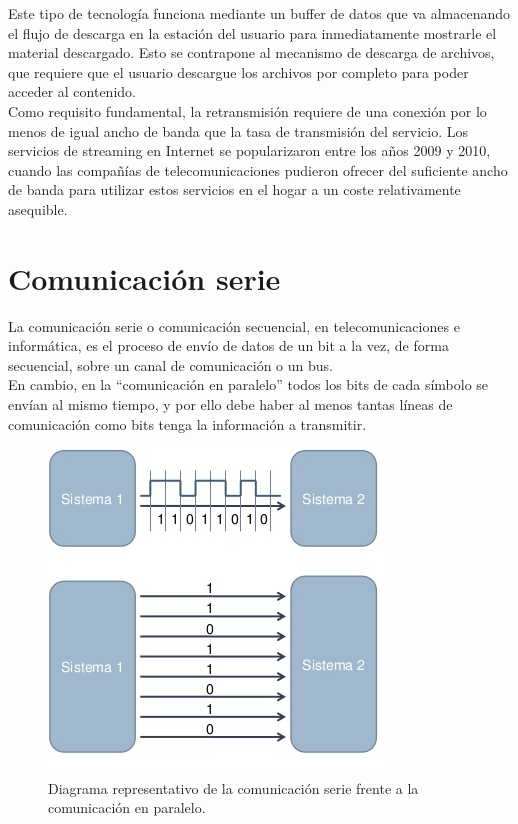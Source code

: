 Este tipo de tecnología funciona mediante un buffer de datos que va almacenando el flujo de descarga en la estación del usuario para inmediatamente mostrarle el material descargado. Esto se contrapone al mecanismo de
descarga de archivos, que requiere que el usuario descargue los archivos por completo para poder acceder al contenido.\\

Como requisito fundamental, la retransmisión requiere de una conexión por lo menos de igual ancho de banda que la tasa de transmisión del servicio. Los servicios de streaming en 
Internet se popularizaron entre los años 2009 y 2010, cuando las compañías de telecomunicaciones pudieron ofrecer del suficiente ancho de banda para utilizar estos servicios
en el hogar a un coste relativamente asequible.

\section{Comunicación serie}

La comunicación serie o comunicación secuencial, en telecomunicaciones e informática, es el proceso de envío de datos de un bit a la vez, de forma secuencial, sobre un canal
de comunicación o un bus.\\

En cambio, en la “comunicación en paralelo” todos los bits de cada símbolo se envían al mismo tiempo, y por ello debe haber al menos tantas líneas de comunicación como bits tenga
la información a transmitir.\\


\begin{figure}[H]
  \begin{center}
    \includegraphics[scale=0.6]{imagenes/serie_paralelo.png}
  \end{center}
  \label{fig:telemetria}
 \caption{Diagrama representativo de la comunicación serie frente a la comunicación en paralelo.}
\end{figure}

